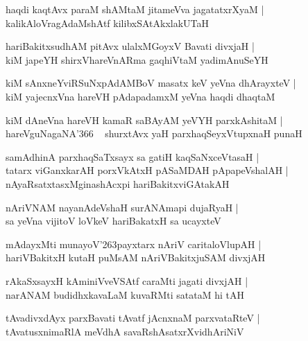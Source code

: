 \documentclass[twoside,12pt,openright]{book}
\def\S{\char'263}
\newcounter{shloka}[chapter]
\begin{document}
\begin{shloka}
haqdi kaqtAvx paraM shAMtaM jitameVva jagatatxrXyaM |\\
kalikAloVragAdaMshAtf kilibxSAtAkxlakUTaH 
\end{shloka}

\begin{shloka}
hariBakitxsudhAM pitAvx ulalxMGoyxV Bavati divxjaH |\\
kiM japeYH shirxVhareVnARma gaqhiVtaM yadimAnuSeYH
\end{shloka}

\begin{shloka}
kiM sAnxneYviRSuNxpAdAMBoV masatx keV yeVna dhArayxteV |\\
kiM yajecnxVna hareVH pAdapadamxM yeVna haqdi dhaqtaM 
\end{shloka}

\begin{shloka}
kiM dAneVna hareVH kamaR saBAyAM yeVYH parxkAshitaM |\\
hareVguNagaNA\char'366 ~ shurxtAvx yaH parxhaqSeyxVtupxnaH punaH 
\end{shloka}

\begin{shloka}
samAdhinA parxhaqSaTxsayx sa gatiH kaqSaNxceVtasaH |\\
tatarx viGanxkarAH porxVkAtxH pASaMDAH pApapeVshalAH |\\
nAyaRsatxtasxMginashAcxpi hariBakitxviGAtakAH 
\end{shloka}

\begin{shloka}
nAriVNAM nayanAdeVshaH surANAmapi dujaRyaH |\\
sa yeVna vijitoV loVkeV hariBakatxH sa ucayxteV
\end{shloka}

\begin{shloka}
mAdayxMti munayoV\S payxtarx nAriV caritaloVlupAH |\\
hariVBakitxH kutaH puMsAM nAriVBakitxjuSAM divxjAH 
\end{shloka}

\begin{shloka}
rAkaSxsayxH kAminiVveVSAtf caraMti jagati divxjAH |\\
narANAM budidhxkavaLaM kuvaRMti satataM hi tAH 
\end{shloka}

\begin{shloka}
tAvadivxdAyx parxBavati tAvatf jAcnxnaM parxvataRteV |\\
tAvatusxnimaRlA meVdhA savaRshAsatxrXvidhAriNiV 
\end{shloka}
\end{document}
